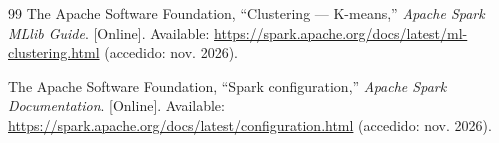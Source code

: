 \documentclass[conference,a4paper]{IEEEtran}
\begin{document}
\begin{thebibliography}{99}
The Apache Software Foundation, ``Clustering --- K-means,'' \textit{Apache Spark MLlib Guide}. [Online]. Available: \url{https://spark.apache.org/docs/latest/ml-clustering.html} (accedido: nov. 2026).

The Apache Software Foundation, ``Spark configuration,'' \textit{Apache Spark Documentation}. [Online]. Available: \url{https://spark.apache.org/docs/latest/configuration.html} (accedido: nov. 2026).

\end{thebibliography}
\end{document}
